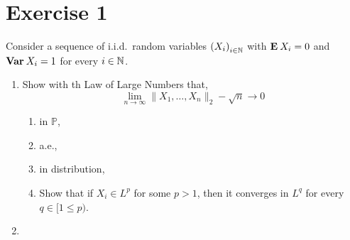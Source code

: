 
\section{Exercise 1}
Consider a sequence of i.i.d.~random variables ${(X_i)}_{i\in\mathbb{N}}$ with $\mathbf{E}\: X_i = 0$ and $\mathbf{Var}\: X_i = 1$ for every $i\in \mathbb{N}$.

\begin{enumerate}
    \item Show with th Law of Large Numbers that,
    \[ \lim_{n\to\infty} \|X_1,\ldots,X_n\|_2 - \sqrt{n} \to 0 \]
    \begin{enumerate}[label=(\alph*)]
        \item in $\mathbb{P}$,
        \item a.e.,
        \item in distribution,
        \item Show that if $X_i \in L^p$ for some $p>1$, then it converges in $L^q$ for every $q \in [1\leq p)$.
    \end{enumerate} 
    \item 
\end{enumerate}
